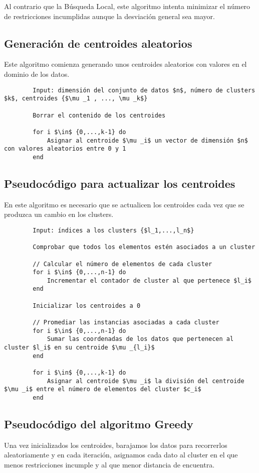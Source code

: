 		Al contrario que la Búsqueda Local, este algoritmo intenta minimizar el número de restricciones incumplidas aunque la desviación general 
		sea mayor.

		\subsection{Generación de centroides aleatorios}
		Este algoritmo comienza generando unos centroides aleatorios con valores en el dominio de los datos.

		\footnotesize
		\begin{lstlisting}
		Input: dimensión del conjunto de datos $n$, número de clusters $k$, centroides {$\mu _1 , ..., \mu _k$}
		
		Borrar el contenido de los centroides

		for i $\in$ {0,...,k-1} do 
			Asignar al centroide $\mu _i$ un vector de dimensión $n$ con valores aleatorios entre 0 y 1
		end
		\end{lstlisting}
		\normalsize

		\subsection{Pseudocódigo para actualizar los centroides}
		En este algoritmo es necesario que se actualicen los centroides cada vez que se produzca un cambio en los clusters.

		\footnotesize
		\begin{lstlisting}
		Input: índices a los clusters {$l_1,...,l_n$}

		Comprobar que todos los elementos estén asociados a un cluster

		// Calcular el número de elementos de cada cluster
		for i $\in$ {0,...,n-1} do 
			Incrementar el contador de cluster al que pertenece $l_i$
		end 

		Inicializar los centroides a 0

		// Promediar las instancias asociadas a cada cluster
		for i $\in$ {0,...,n-1} do
			Sumar las coordenadas de los datos que pertenecen al cluster $l_i$ en su centroide $\mu _{l_i}$
		end
		
		for i $\in$ {0,...,k-1} do
			Asignar al centroide $\mu _i$ la división del centroide $\mu _i$ entre el número de elementos del cluster $c_i$
		end
		\end{lstlisting}
		\normalsize

		\subsection{Pseudocódigo del algoritmo Greedy}
		Una vez inicializados los centroides, barajamos los datos para recorrerlos aleatoriamente y en cada iteración, asignamos 
		cada dato al cluster en el que menos restricciones incumple y al que menor distancia de encuentra.

